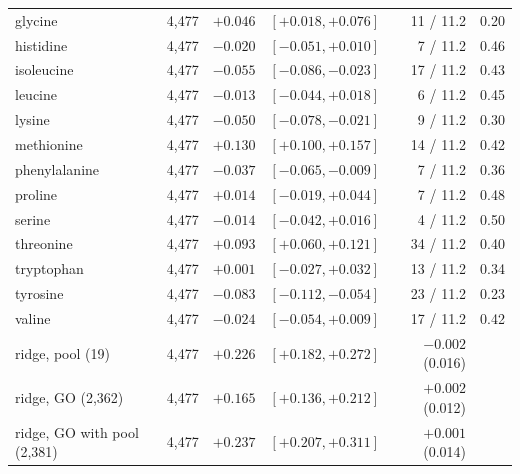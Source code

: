 \begin{table}[H]
\begin{tabular}{@{}lrrlrr@{}}
    glycine & 4,477 & $+0.046$ & $[+0.018, +0.076]$ & 11 / 11.2 & 0.20 \\
    histidine & 4,477 & $-0.020$ & $[-0.051, +0.010]$ & 7 / 11.2 & 0.46 \\
    isoleucine & 4,477 & $-0.055$ & $[-0.086, -0.023]$ & 17 / 11.2 & 0.43 \\
    leucine & 4,477 & $-0.013$ & $[-0.044, +0.018]$ & 6 / 11.2 & 0.45 \\
    lysine & 4,477 & $-0.050$ & $[-0.078, -0.021]$ & 9 / 11.2 & 0.30 \\
    methionine & 4,477 & $+0.130$ & $[+0.100, +0.157]$ & 14 / 11.2 & 0.42 \\
    phenylalanine & 4,477 & $-0.037$ & $[-0.065, -0.009]$ & 7 / 11.2 & 0.36 \\
    proline & 4,477 & $+0.014$ & $[-0.019, +0.044]$ & 7 / 11.2 & 0.48 \\
    serine & 4,477 & $-0.014$ & $[-0.042, +0.016]$ & 4 / 11.2 & 0.50 \\
    threonine & 4,477 & $+0.093$ & $[+0.060, +0.121]$ & 34 / 11.2 & 0.40 \\
    tryptophan & 4,477 & $+0.001$ & $[-0.027, +0.032]$ & 13 / 11.2 & 0.34 \\
    tyrosine & 4,477 & $-0.083$ & $[-0.112, -0.054]$ & 23 / 11.2 & 0.23 \\
    valine & 4,477 & $-0.024$ & $[-0.054, +0.009]$ & 17 / 11.2 & 0.42 \\
    ridge, pool (19) & 4,477 & $+0.226$ & $[+0.182, +0.272]$ & $-0.002$ (0.016) & \\
    ridge, GO (2,362) & 4,477 & $+0.165$ & $[+0.136, +0.212]$ & $+0.002$ (0.012) & \\
    ridge, GO with pool (2,381) & 4,477 & $+0.237$ & $[+0.207, +0.311]$ & $+0.001$ (0.014) & \\
    \hline
  \end{tabular}
\end{table}

